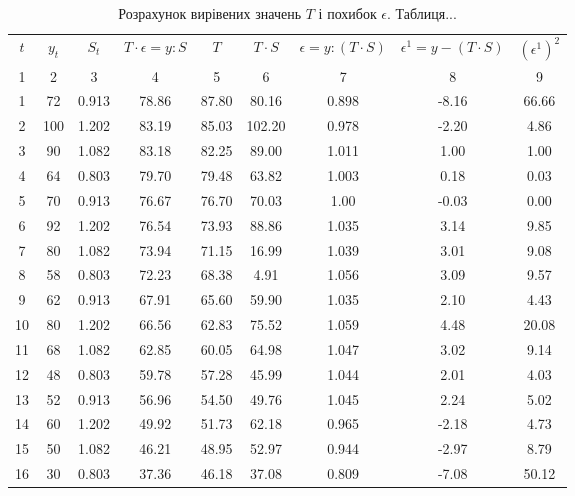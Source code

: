 \documentclass[a4paper, fontsize=10pt, oneside]{article}
\begin{document}
\begin{table}
\caption{Розрахунок вирівених значень $T$ і похибок $\epsilon$. Таблиця...}
\begin{tabular}{|c|c|c|c|c|c|c|c|c|}
\hline
$t$ & $y_{t}$ & $S_{t}$ & $T \cdot \epsilon = y : S$ & $T$ & $T \cdot S$ & $\epsilon = y : (T \cdot S)$ & $\epsilon^{1} = y - (T \cdot S)$ & $(\epsilon^{1})^2$\\
1 & 2 & 3 & 4 & 5 & 6 & 7 & 8 & 9\\
1 & 72 & 0.913 & 78.86 & 87.80 & 80.16 & 0.898 & -8.16 & 66.66\\
\hline
2 & 100 & 1.202 & 83.19 & 85.03 & 102.20 & 0.978 & -2.20 & 4.86\\
\hline
3 & 90 & 1.082 & 83.18 & 82.25 & 89.00 & 1.011 & 1.00 & 1.00\\
\hline
4 & 64 & 0.803 & 79.70 & 79.48 & 63.82 & 1.003 & 0.18 & 0.03\\
\hline
5 & 70 & 0.913 & 76.67 & 76.70 & 70.03 & 1.00 & -0.03 & 0.00\\
\hline
6 & 92 & 1.202 & 76.54 & 73.93 & 88.86 & 1.035 & 3.14 & 9.85\\
\hline
7 & 80 & 1.082 & 73.94 & 71.15 & 16.99 & 1.039 & 3.01 & 9.08\\
\hline
8 & 58 & 0.803 & 72.23 & 68.38 & 4.91 & 1.056 & 3.09 & 9.57\\
\hline
9 & 62 & 0.913 & 67.91 & 65.60 & 59.90 & 1.035 & 2.10 & 4.43\\
\hline
10 & 80 & 1.202 & 66.56 & 62.83 & 75.52 & 1.059 & 4.48 & 20.08 \\
\hline
11 & 68 & 1.082 & 62.85 & 60.05 & 64.98 & 1.047 & 3.02 & 9.14\\
\hline
12 & 48 & 0.803 & 59.78 & 57.28 & 45.99 & 1.044 & 2.01 & 4.03\\
\hline
13 & 52 & 0.913 & 56.96 & 54.50 & 49.76 & 1.045 & 2.24 & 5.02\\
\hline
14 & 60 & 1.202 & 49.92 & 51.73 & 62.18 & 0.965 & -2.18 & 4.73\\
\hline
15 & 50 & 1.082 & 46.21 & 48.95 & 52.97 & 0.944 & -2.97 & 8.79\\
\hline
16 & 30 & 0.803 & 37.36 & 46.18 & 37.08 & 0.809 & -7.08 & 50.12\\
\hline
\end{tabular}
\end{table}
\end{document}
